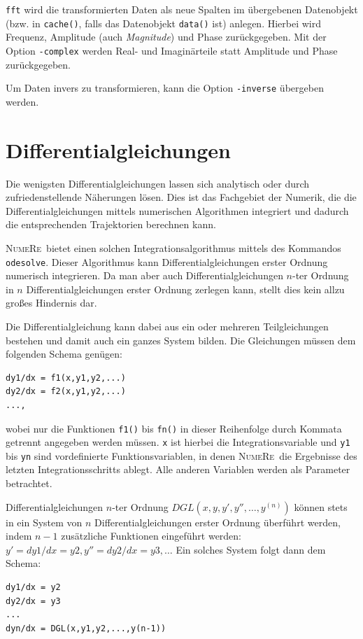 \documentclass[DIV=14,headsepline,footsepline]{scrbook}
\newcommand{\NR}{\textsc{Nu\-me\-Re}}
\begin{document}
				\verb+fft+ wird die transformierten Daten als neue Spalten im übergebenen Datenobjekt (bzw. in \verb+cache()+, falls das Datenobjekt \verb+data()+ ist) anlegen. Hierbei wird Frequenz, Amplitude (auch \emph{Magnitude}) und Phase zurückgegeben. Mit der Option \verb+-complex+ werden Real- und Imaginärteile statt Amplitude und Phase zurückgegeben.
				
				Um Daten invers zu transformieren, kann die Option \verb+-inverse+ übergeben werden.
				
			\section{Differentialgleichungen}
				Die wenigsten Differentialgleichungen lassen sich analytisch oder durch zufriedenstellende Näherungen lösen. Dies ist das Fachgebiet der Numerik, die die Differentialgleichungen mittels numerischen Algorithmen integriert und dadurch die entsprechenden Trajektorien berechnen kann.
				
				\NR\ bietet einen solchen Integrationsalgorithmus mittels des Kommandos \verb+odesolve+. Dieser Algorithmus kann Differentialgleichungen erster Ordnung numerisch integrieren. Da man aber auch Differentialgleichungen $n$-ter Ordnung in $n$ Differentialgleichungen erster Ordnung zerlegen kann, stellt dies kein allzu großes Hindernis dar.
				
				Die Differentialgleichung kann dabei aus ein oder mehreren Teilgleichungen bestehen und damit auch ein ganzes System bilden. Die Gleichungen müssen dem folgenden Schema genügen:
				\begin{lstlisting}
dy1/dx = f1(x,y1,y2,...)
dy2/dx = f2(x,y1,y2,...)
...,				
				\end{lstlisting}
				wobei nur die Funktionen \verb+f1()+ bis \verb+fn()+ in dieser Reihenfolge durch Kommata getrennt angegeben werden müssen. \verb+x+ ist hierbei die Integrationsvariable und \verb+y1+ bis \verb+yn+ sind vordefinierte Funktionsvariablen, in denen \NR\ die Ergebnisse des letzten Integrationsschritts ablegt. Alle anderen Variablen werden als Parameter betrachtet.
	
				Differentialgleichungen $n$-ter Ordnung $DGL(x,y,y',y'',\ldots,y^{(n)})$ können stets in ein System von $n$ Differentialgleichungen erster Ordnung überführt werden, indem $n-1$ zusätzliche Funktionen eingeführt werden: $y' = dy1/dx = y2, y'' = dy2/dx = y3, \ldots$ Ein solches System folgt dann dem Schema:
				\begin{lstlisting}
dy1/dx = y2
dy2/dx = y3
...
dyn/dx = DGL(x,y1,y2,...,y(n-1))
				\end{lstlisting}
	
\end{document}
